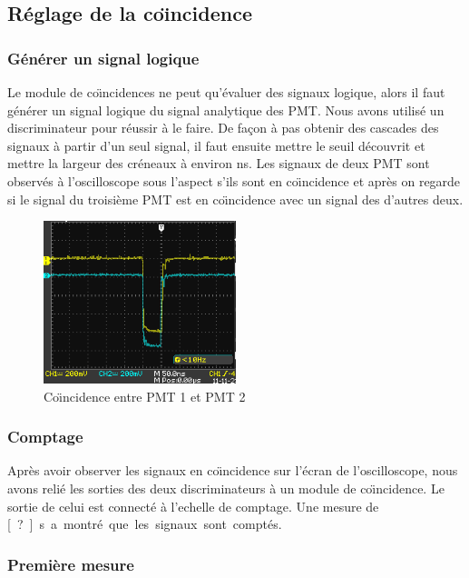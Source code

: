 \documentclass[a4paper,11pt,liststotocnumbered,bibtotocnumbered]{scrartcl}
\begin{document}
  \subsection{Réglage de la co\"{\i}ncidence}
   \subsubsection{Générer un signal logique}
    Le module de co\"{\i}ncidences ne peut qu'évaluer des signaux logique, alors il faut générer un signal logique du signal analytique des PMT. Nous avons utilisé un discriminateur pour réussir à le faire. De fa\c con à pas obtenir des cascades des signaux à partir d'un seul signal, il faut ensuite mettre le seuil découvrit et mettre la largeur des créneaux à environ \unit[600]{ns}. Les signaux de deux PMT sont observés à l'oscilloscope sous l'aspect s'ils sont en co\"{\i}ncidence et après on regarde si le signal du troisième PMT est en co\"{\i}ncidence avec un signal des d'autres deux.
    \begin{figure}
     \centering
     \includegraphics[width=0.5\textwidth]{bilder/coinvrai.png}
     \caption{Co\"{\i}ncidence entre PMT 1 et PMT 2}
    \end{figure}

   
  
   \subsubsection{Comptage}
    Après avoir observer les signaux en co\"{\i}ncidence sur l'écran de l'oscilloscope, nous avons relié les sorties des deux discriminateurs à un module de co\"{\i}ncidence. Le sortie de celui est connecté à l'echelle de comptage. Une mesure de \unit[?]{s} a montré que les signaux sont comptés.
   
   
   \subsubsection{Première mesure}
   
\end{document}
